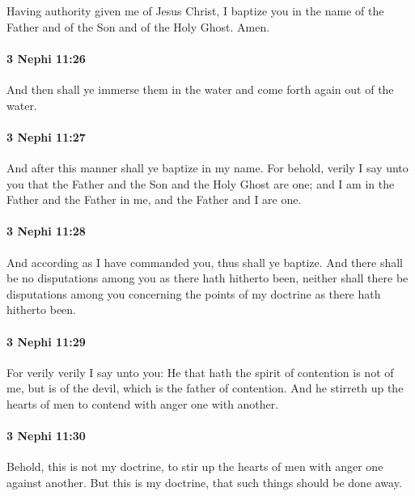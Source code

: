 			Having authority given me of Jesus Christ,
			I baptize you in the name of the Father and of the Son and of the Holy Ghost.
			Amen.

		\paragraph{3 Nephi 11:26} %
			\label{3NEPHI-11-26}

			And then shall ye immerse them in the water
			and come forth again out of the water.

		\paragraph{3 Nephi 11:27} %
			\label{3NEPHI-11-27}

			And after this manner shall ye baptize in my name.
			For behold, verily I say unto you
			that the Father and the Son and the Holy Ghost are one;
			and I am in the Father and the Father in me,
			and the Father and I are one.

		\paragraph{3 Nephi 11:28} %
			\label{3NEPHI-11-28}

			And according as I have commanded you, thus shall ye baptize.
			And there shall be no disputations among you
			as there hath hitherto been,
			neither shall there be disputations among you
			concerning the points of my doctrine
			as there hath hitherto been.

		\paragraph{3 Nephi 11:29} %
			\label{3NEPHI-11-29}

			For verily verily I say unto you:
			He that hath the spirit of contention is not of me,
			but is of the devil, which is the father of contention.
			And he stirreth up the hearts of men
			to contend with anger one with another.

		\paragraph{3 Nephi 11:30} %
			\label{3NEPHI-11-30}

			Behold, this is not my doctrine,
			to stir up the hearts of men with anger one against another.
			But this is my doctrine,
			that such things should be done away.

